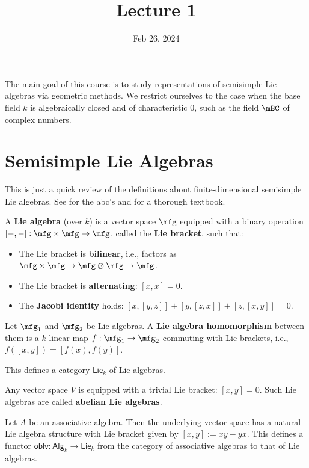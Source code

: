 





\title{Lecture 1}

\date{Feb 26, 2024}

\maketitle

The main goal of this course is to study representations of semisimple Lie algebras via geometric methods. We restrict ourselves to the case when the base field $k$ is algebraically closed and of characteristic $0$, such as the field $\mBC$ of complex numbers.


\section{Semisimple Lie Algebras}
This is just a quick review of the definitions about finite-dimensional semisimple Lie algebras. See \cite[Chapter 0]{Hum} for the abc's and \cite{Ser} for a thorough textbook.

\begin{defn}
	A \textbf{Lie algebra} (over $k$) is a vector space $\mfg$ equipped with a binary operation $[-,-]:\mfg\times \mfg \to \mfg$, called the \textbf{Lie bracket}, such that:
	\begin{itemize}
		\item
			The Lie bracket is \textbf{bilinear}, i.e., factors as $\mfg\times \mfg \to \mfg\otimes\mfg \to \mfg$.
		\item 
			The Lie bracket is \textbf{alternating}: $[x,x]=0$.
		\item
			The \textbf{Jacobi identity} holds: $[x,[y,z]]+[y,[z,x]]+[z,[x,y]]=0$.
	\end{itemize}

	Let $\mfg_1$ and $\mfg_2$ be Lie algebras. A \textbf{Lie algebra homomorphism} between them is a $k$-linear map $f: \mfg_1\to \mfg_2$ commuting with Lie brackets, i.e., $f([x,y]) = [f(x),f(y)]$.

	This defines a category $\mathsf{Lie}_k$ of Lie algebras.
\end{defn}


\begin{exam}
	Any vector space $V$ is equipped with a trivial Lie bracket: $[x,y]=0$. Such Lie algebras are called \textbf{abelian Lie algebras}.
\end{exam}

\begin{exam}
	\label{exam-assoc-to-Lie}
	Let $A$ be an associative algebra. Then the underlying vector space has a natural Lie algebra structure with Lie bracket given by $[x,y]:= xy-yx$. This defines a functor $\mathsf{oblv}:\mathsf{Alg}_k \to \mathsf{Lie}_k$ from the category of associative algebras to that of Lie algebras.
\end{exam}

